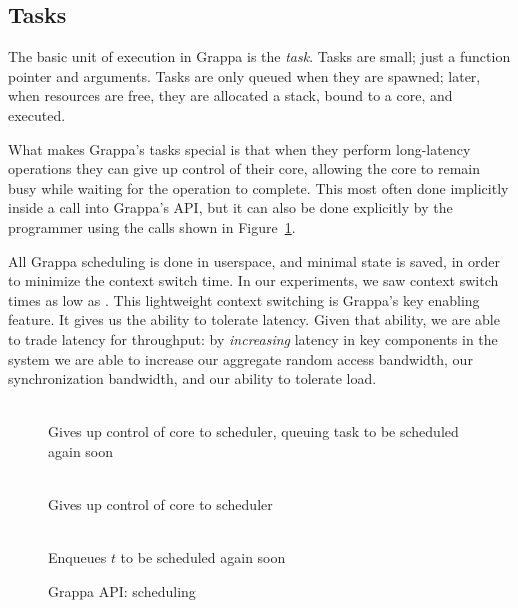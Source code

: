 
\subsection{Tasks}


The basic unit of execution in Grappa is the {\em task}. Tasks are
small; just a function pointer and arguments. Tasks are only
queued when they are spawned; later, when resources are free, they are
allocated a stack, bound to a core, and executed.

What makes Grappa's tasks special is that when they perform
long-latency operations they can give up control of their core,
allowing the core to remain busy while waiting for the operation to
complete. This most often done implicitly inside a call into Grappa's
API, but it can also be done explicitly by the programmer using the
calls shown in Figure~\ref{fig:scheduling}. 

All Grappa scheduling is done in userspace, and minimal state is
saved, in order to minimize the context switch time. In our
experiments, we saw context switch times as low as .
This lightweight context switching is Grappa's key enabling
feature. It gives us the ability to tolerate latency. Given that
ability, we are able to trade latency for throughput: by {\em
  increasing} latency in key components in the system we are able to
increase our aggregate random access bandwidth, our synchronization
bandwidth, and our ability to tolerate load.

\begin{figure}[htbp]
  \begin{center}
    \begin{description}\small
    \item[ \texttt{ yield() } ] \hfill \\
      Gives up control of core to scheduler, queuing task to be scheduled again soon
    \item[ \texttt{ suspend() } ] \hfill \\
      Gives up control of core to scheduler
    \item[ \texttt{ wake( task * $t$ ) } ] \hfill \\
      Enqueues $t$ to be scheduled again soon
    \end{description}
    \begin{minipage}{0.95\columnwidth}
      \caption{\label{fig:scheduling} Grappa API: scheduling} %
    \end{minipage}
  \end{center}
\end{figure}


